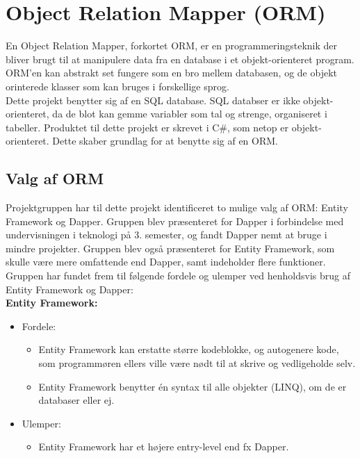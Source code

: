 \section{Object Relation Mapper (ORM)}\label{sec:orm}
En Object Relation Mapper, forkortet ORM, er en programmeringsteknik der bliver brugt til
at manipulere data fra en database i et objekt-orienteret program. ORM'en kan abstrakt set fungere som en bro mellem databasen, og de objekt orinterede klasser som kan bruges i forskellige sprog.   
\\

Dette projekt benytter sig af en SQL database. SQL databser er ikke objekt-orienteret, da de
blot kan gemme variabler som tal og strenge, organiseret i tabeller. Produktet til dette projekt
er skrevet i C\#, som netop er objekt-orienteret. Dette skaber grundlag for at benytte sig af en
ORM. 

\subsection{Valg af ORM}\label{dapper}
Projektgruppen har til dette projekt identificeret to mulige valg af ORM: Entity Framework og Dapper.
Gruppen blev præsenteret for Dapper i forbindelse med undervisningen i teknologi på 3. semester, og fandt Dapper
nemt at bruge i mindre projekter. Gruppen blev også præsenteret for Entity Framework, som skulle være mere omfattende
end Dapper, samt indeholder flere funktioner. \\ 

Gruppen har fundet frem til følgende fordele og ulemper ved henholdsvis brug af Entity Framework og Dapper: \\

\textbf{Entity Framework:}
\begin{itemize}
    \item Fordele:
    \begin{itemize}
        \item Entity Framework kan erstatte større kodeblokke, og autogenere kode, som programmøren ellers ville være nødt til at skrive og vedligeholde selv.
        \item Entity Framework benytter én syntax til alle objekter (LINQ), om de er databaser eller ej.
    \end{itemize}
    \item Ulemper:
    \begin{itemize}
        \item Entity Framework har et højere entry-level end fx Dapper.
    \end{itemize}
\end{itemize}

